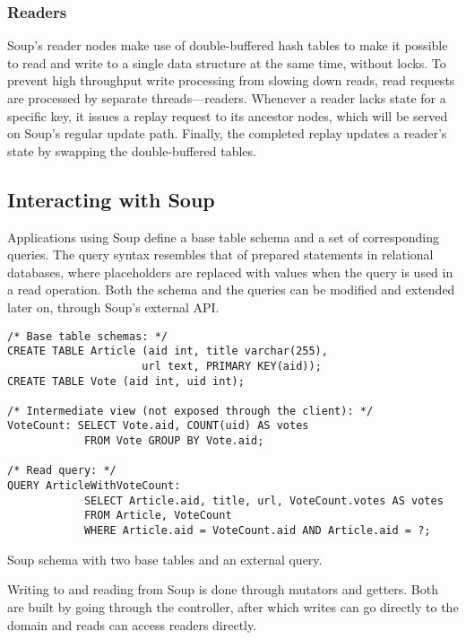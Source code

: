 \subsubsection{Readers}

Soup's reader nodes make use of double-buffered hash tables to make it possible
to read and write to a single data structure at the same time, without locks. To
prevent high throughput write processing from slowing down reads, read requests
are processed by separate threads---readers. Whenever a reader lacks state for a
specific key, it issues a replay request to its ancestor nodes, which will be
served on Soup's regular update path. Finally, the completed replay updates a
reader's state by swapping the double-buffered tables.

\subsection{Interacting with Soup}

Applications using Soup define a base table schema and a set of corresponding
queries. The query syntax resembles that of prepared statements in relational
databases, where placeholders are replaced with values when the query is used in
a read operation. Both the schema and the queries can be modified and extended
later on, through Soup's external API.\@

\begin{listing}[H]
  \begin{verbatim}
/* Base table schemas: */
CREATE TABLE Article (aid int, title varchar(255),
                     url text, PRIMARY KEY(aid));
CREATE TABLE Vote (aid int, uid int);

/* Intermediate view (not exposed through the client): */
VoteCount: SELECT Vote.aid, COUNT(uid) AS votes
            FROM Vote GROUP BY Vote.aid;

/* Read query: */
QUERY ArticleWithVoteCount:
            SELECT Article.aid, title, url, VoteCount.votes AS votes
            FROM Article, VoteCount
            WHERE Article.aid = VoteCount.aid AND Article.aid = ?;
  \end{verbatim}
  \caption{Soup schema with two base tables and an external query.}\label{lst:soup-schema}
\end{listing}

Writing to and reading from Soup is done through mutators and getters. Both are
built by going through the controller, after which writes can go directly to the
domain and reads can access readers directly.

